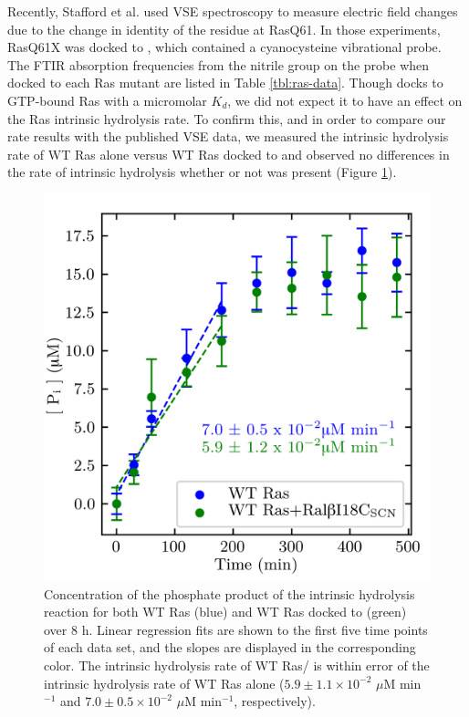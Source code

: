 Recently, Stafford et al. used VSE spectroscopy to measure electric field changes due to the change in identity of the residue at RasQ61\cite{Stafford2012}. 
In those experiments, RasQ61X was docked to \RalBSCN{}, which contained a cyanocysteine vibrational probe. 
The FTIR absorption frequencies from the nitrile group on the probe when docked to each Ras mutant are listed in Table \ref{tbl:ras-data}. 
Though \RalB{} docks to GTP-bound Ras with a micromolar $K_d$, we did not expect it to have an effect on the Ras intrinsic hydrolysis rate. 
To confirm this, and in order to compare our rate results with the published VSE data, we measured the intrinsic hydrolysis rate of WT Ras alone versus WT Ras docked to \RalBSCN{} and observed no differences in the rate of intrinsic hydrolysis whether or not \RalBSCN{} was present (Figure \ref{fig:ras-ral}).

\begin{figure}
    \center
    \includegraphics[width=\single]{figures-ras/Figure3.png}
    \caption{
        Concentration of the phosphate product of the intrinsic hydrolysis reaction for both WT Ras (blue) and WT Ras docked to \RalBSCN{} (green) over 8 h. 
        Linear regression fits are shown to the first five time points of each data set, and the slopes are displayed in the corresponding color. 
        The intrinsic hydrolysis rate of WT Ras/\RalBSCN{} is within error of the intrinsic hydrolysis rate of WT Ras alone ($5.9 \pm 1.1 \times 10^{-2}$ $\mu$M min$^{-1}$ and $7.0 \pm 0.5 \times 10^{-2}$ $\mu$M min$^{-1}$, respectively).
    }
    \label{fig:ras-ral}
\end{figure}

